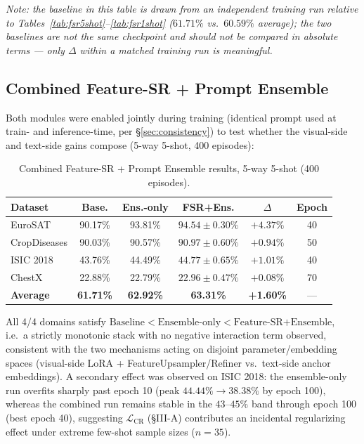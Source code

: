 \documentclass[conference]{IEEEtran}
\begin{document}
\noindent\textit{Note: the baseline in this table is drawn from an independent training run relative to Tables~\ref{tab:fsr5shot}--\ref{tab:fsr1shot} ($61.71\%$ vs.\ $60.59\%$ average); the two baselines are not the same checkpoint and should not be compared in absolute terms --- only $\Delta$ within a matched training run is meaningful.}

\subsection{Combined Feature-SR + Prompt Ensemble} \label{sec:combined}

Both modules were enabled jointly during training (identical prompt used at train- and inference-time, per \S\ref{sec:consistency}) to test whether the visual-side and text-side gains compose (5-way 5-shot, 400 episodes):

\begin{table}[t]
\centering
\caption{Combined Feature-SR + Prompt Ensemble results, 5-way 5-shot (400 episodes).}
\label{tab:combined}
\footnotesize
\setlength{\tabcolsep}{3.5pt}
\begin{tabular}{lccccc}
\toprule
Dataset & Base. & Ens.-only & \textbf{FSR+Ens.} & $\Delta$ & Epoch \\
\midrule
EuroSAT      & 90.17\% & 93.81\% & $\mathbf{94.54{\pm}0.30\%}$ & $\mathbf{+4.37\%}$ & 40 \\
CropDiseases & 90.03\% & 90.57\% & $\mathbf{90.97{\pm}0.60\%}$ & $\mathbf{+0.94\%}$ & 50 \\
ISIC 2018    & 43.76\% & 44.49\% & $\mathbf{44.77{\pm}0.65\%}$ & $\mathbf{+1.01\%}$ & 40 \\
ChestX       & 22.88\% & 22.79\% & $\mathbf{22.96{\pm}0.47\%}$ & $+0.08\%$ & 70 \\
\midrule
\textbf{Average} & \textbf{61.71\%} & \textbf{62.92\%} & \textbf{63.31\%} & \textbf{+1.60\%} & --- \\
\bottomrule
\end{tabular}
\end{table}

All 4/4 domains satisfy $\text{Baseline} < \text{Ensemble-only} < \text{Feature-SR+Ensemble}$, i.e.\ a strictly monotonic stack with no negative interaction term observed, consistent with the two mechanisms acting on disjoint parameter/embedding spaces (visual-side LoRA + FeatureUpsampler/Refiner vs.\ text-side anchor embeddings). A secondary effect was observed on ISIC 2018: the ensemble-only run overfits sharply past epoch 10 (peak $44.44\% \rightarrow 38.38\%$ by epoch 100), whereas the combined run remains stable in the $43$--$45\%$ band through epoch 100 (best epoch 40), suggesting $\mathcal{L}_{\text{CR}}$ (\S III-A) contributes an incidental regularizing effect under extreme few-shot sample sizes ($n=35$).
\end{document}

